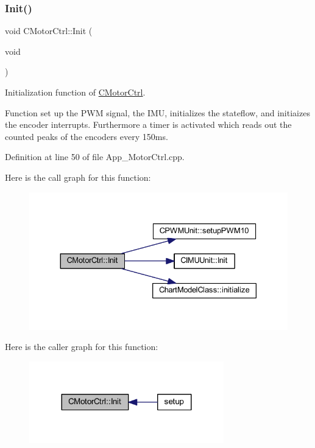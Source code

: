 \subsubsection{\texorpdfstring{Init()}{Init()}}
{\footnotesize\ttfamily void C\+Motor\+Ctrl\+::\+Init (\begin{DoxyParamCaption}\item[{void}]{ }\end{DoxyParamCaption})}



Initialization function of \mbox{\hyperlink{class_c_motor_ctrl}{C\+Motor\+Ctrl}}. 

Function set up the P\+WM signal, the I\+MU, initializes the stateflow, and initiaizes the encoder interrupts. Furthermore a timer is activated which reads out the counted peaks of the encoders every 150ms. 

Definition at line 50 of file App\+\_\+\+Motor\+Ctrl.\+cpp.

Here is the call graph for this function\+:
\nopagebreak
\begin{figure}[H]
\begin{center}
\leavevmode
\includegraphics[width=330pt]{class_c_motor_ctrl_af4b1bec8e07e766aa2537d966f025e7a_cgraph}
\end{center}
\end{figure}
Here is the caller graph for this function\+:
\nopagebreak
\begin{figure}[H]
\begin{center}
\leavevmode
\includegraphics[width=239pt]{class_c_motor_ctrl_af4b1bec8e07e766aa2537d966f025e7a_icgraph}
\end{center}
\end{figure}
\mbox{\label{class_c_motor_ctrl_af3e047be659fb9f49f1644ba2eca4684}} 

